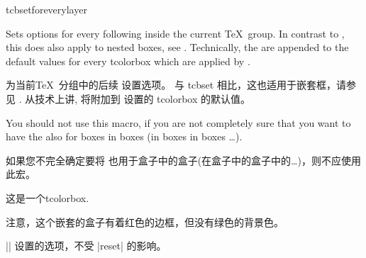 \begin{docCommand}{tcbsetforeverylayer}{}
\begin{stripedbox}
Sets options for every following  inside the current \TeX\ group.
In contrast to , this does also
apply to nested boxes, see .
Technically, the  are appended to the default values for every
tcolorbox which are applied by .\par
\tcblower
为当前\TeX\ 分组中的后续  设置选项。
与 tcbset 相比，这也适用于嵌套框，请参见 .
从技术上讲,   将附加到  设置的 tcolorbox 的默认值。\par
\end{stripedbox}



  
You should not use this macro, if you are not completely sure that you
want to have the  also for boxes in boxes (in boxes in boxes \ldots).

如果您不完全确定要将  也用于盒子中的盒子(在盒子中的盒子中的\ldots)，则不应使用此宏。
\begin{dispExample}

\begin{tcolorbox}[title=All options for this box]
这是一个tcolorbox.\par\medskip
  \begin{tcolorbox}[title=嵌套的盒子]
    注意，这个嵌套的盒子有着红色的边框，但没有绿色的背景色。
  \end{tcolorbox}
\end{tcolorbox}
\bigskip

\begin{tcolorbox}[reset]
|\tcbsetforeverylayer| 设置的选项，不受 |reset| 的影响。
\end{tcolorbox}
\end{dispExample}
\end{docCommand}


